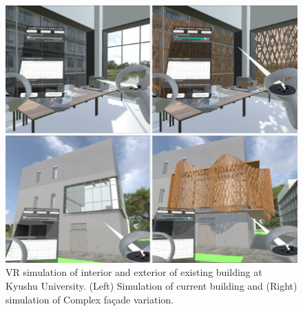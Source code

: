      \begin{figure}[t]
          \centering
          \includegraphics[width= \linewidth]{Images/VRInteriorExterior}
          \caption{VR simulation of interior and exterior of existing building at Kyushu University. (Left) Simulation of current building and (Right) simulation of Complex façade variation.}
          \label{fig:VRInteriorExterior}
        \end{figure}

